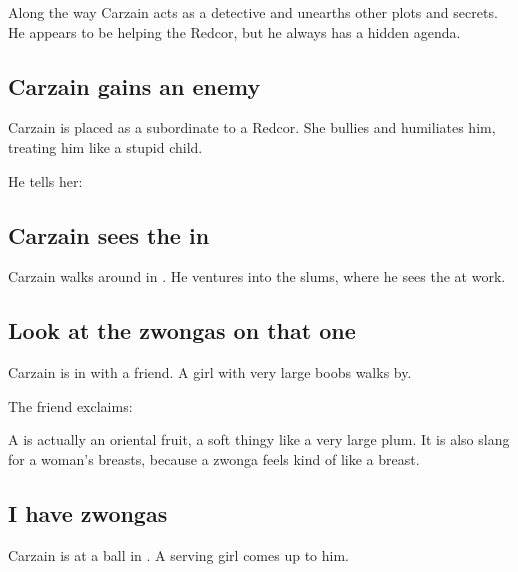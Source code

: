 Along the way Carzain acts as a detective and unearths other plots and secrets. 
He appears to be helping the Redcor, but he always has a hidden agenda.









\subsection{Carzain gains an enemy}
Carzain is placed as a subordinate to a Redcor. 
She bullies and humiliates him, treating him like a stupid child. 

He tells her: 









\subsection{Carzain sees the \Morbus{} in \Redce}
Carzain walks around in \Redce. He ventures into the slums, where he sees the  at work.







\subsection{Look at the zwongas on that one}
Carzain is in \Redce{} with a friend. 
A girl with very large boobs walks by. 

The friend exclaims: 

A  is actually an oriental fruit, a soft thingy like a very large plum. 
It is also slang for a woman's breasts, because a zwonga feels kind of like a breast. 









\subsection{I have zwongas}
Carzain is at a ball in \Redce. 
A serving girl comes up to him. 

